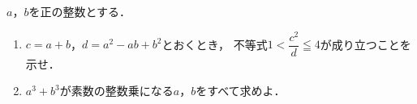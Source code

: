\documentclass[../../main.tex]{subfiles}
\begin{document}
$a$，$b$を正の整数とする．
\begin{enumerate}
  \item $c=a+b$，$d=a^2-ab+b^2$とおくとき，
    不等式$\displaystyle1<\dfrac{c^2}{d}\leqq4$が成り立つことを示せ．
  \item $a^3+b^3$が素数の整数乗になる$a$，$b$をすべて求めよ．
\end{enumerate}
\end{document}
